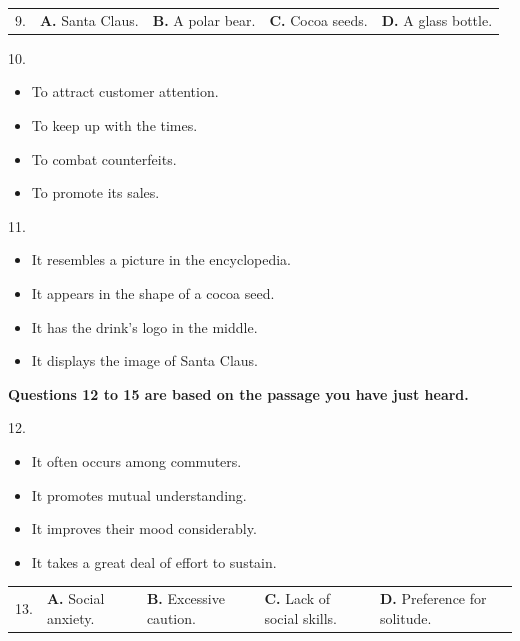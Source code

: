 \documentclass[UTF8,11pt]{ctexart}
\begin{document}
\noindent\begin{tabularx}{\linewidth}{@{}lXXXX@{}}9. & \textbf{A.} Santa Claus. & \textbf{B.} A polar bear. & \textbf{C.} Cocoa seeds. & \textbf{D.} A glass bottle.\\\end{tabularx}\par

10.


\begin{itemize}[leftmargin=2em,itemsep=.2em,topsep=.4em]\item[A.] To attract customer attention.
\item[B.] To keep up with the times.
\item[C.] To combat counterfeits.
\item[D.] To promote its sales.
\end{itemize}

11.


\begin{itemize}[leftmargin=2em,itemsep=.2em,topsep=.4em]\item[A.] It resembles a picture in the encyclopedia.
\item[B.] It appears in the shape of a cocoa seed.
\item[C.] It has the drink's logo in the middle.
\item[D.] It displays the image of Santa Claus.
\end{itemize}

\textbf{Questions 12 to 15 are based on the passage you have just heard.}


12.


\begin{itemize}[leftmargin=2em,itemsep=.2em,topsep=.4em]\item[A.] It often occurs among commuters.
\item[B.] It promotes mutual understanding.
\item[C.] It improves their mood considerably.
\item[D.] It takes a great deal of effort to sustain.
\end{itemize}

\noindent\begin{tabularx}{\linewidth}{@{}lXXXX@{}}13. & \textbf{A.} Social anxiety. & \textbf{B.} Excessive caution. & \textbf{C.} Lack of social skills. & \textbf{D.} Preference for solitude.\\\end{tabularx}\par
\end{document}
